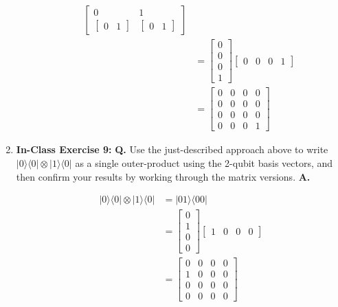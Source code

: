 \documentclass[main.tex]{subfiles}
\begin{document}
\begin{enumerate}
\begin{enumerate}
\begin{align*}
                                                    \left[\begin{array}{ll} 0 & 1 \\
                                                    {\left[\begin{array}{ll} 0 & 1 \end{array}\right]} & 
                                                    {\left[\begin{array}{ll} 0 & 1 \end{array}\right]} \end{array}\right]\\
                                                    & = \left[\begin{array}{l} 0 \\ 0 \\ 0 \\ 1 \end{array}\right]
                                                    \left[\begin{array}{llll} 0 & 0 & 0 & 1 \end{array}\right]\\
                                                    & = \left[\begin{array}{llll} 0&0&0&0\\0&0&0&0\\0&0&0&0\\0&0&0&1\end{array}\right]
        \end{align*}
    \end{enumerate}

\item[] \textbf{In-Class Exercise 9:} \textbf{Q.} Use the just-described approach above to write $|0\rangle\langle 0|\otimes| 1\rangle\langle 0|$ as a single outer-product using the 2-qubit basis vectors, and then confirm your results by working through the matrix versions. \textbf{A.}

    \begin{align*}
        |0\rangle\langle0| \otimes |1\rangle\langle0|   & = |01\rangle \langle00|\\
                                                        & = \left[\begin{array}{l} 0 \\ 1 \\ 0 \\ 0 \end{array}\right]
                                                        \left[\begin{array}{llll} 1 & 0 & 0 & 0 \end{array}\right]\\
                                                        & = \left[\begin{array}{llll} 0&0&0&0\\1&0&0&0\\0&0&0&0\\0&0&0&0\end{array}\right]
    \end{align*}
    

\end{enumerate}
\end{document}
